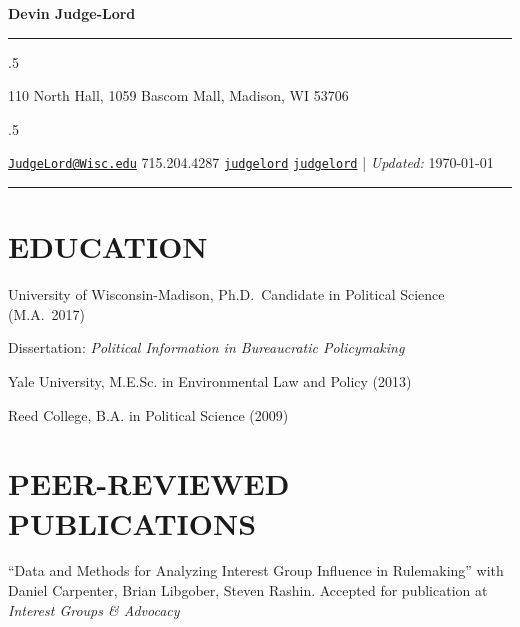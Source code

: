 \documentclass[11pt,]{article}
\providecommand{\tightlist}{%
  \setlength{\itemsep}{0pt}\setlength{\parskip}{0pt}}
\renewenvironment{itemize}{
  \begin{list}{}{
    \setlength{\leftmargin}{1.5em}
  }
}{
  \end{list}
}
\begin{document}
\centerline{\huge \bf Devin Judge-Lord}

\vspace{2 mm}

\hrule

\vspace{2 mm}


\moveleft.5\hoffset\centerline{110 North Hall, 1059 Bascom Mall, Madison, WI 53706}
\moveleft.5\hoffset\centerline{ \faEnvelopeO \hspace{1 mm} \href{mailto:}{\tt \href{mailto:JudgeLord@Wisc.edu}{\nolinkurl{JudgeLord@Wisc.edu}}} \hspace{1 mm}  \faPhone \hspace{1 mm}  715.204.4287  \hspace{1 mm}  \faGithub \hspace{1 mm} \href{http://github.com/judgelord}{\tt judgelord} \hspace{1 mm}   \faTwitter \hspace{1 mm} \href{https:/twitter.com/judgelord}{\tt judgelord} \hspace{1 mm}    | \emph{Updated:} \today}

\vspace{2 mm}

\hrule


\hypertarget{education}{%
\section{EDUCATION}\label{education}}

University of Wisconsin-Madison, Ph.D.~Candidate in Political Science
(M.A.~2017)

\begin{itemize}
\tightlist
\item
  Dissertation: \emph{Political Information in Bureaucratic
  Policymaking}
\end{itemize}

Yale University, M.E.Sc. in Environmental Law and Policy (2013)

Reed College, B.A. in Political Science (2009)

\hypertarget{peer-reviewed-publications}{%
\section{PEER-REVIEWED PUBLICATIONS}\label{peer-reviewed-publications}}

``Data and Methods for Analyzing Interest Group Influence in
Rulemaking'' with Daniel Carpenter, Brian Libgober, Steven Rashin.
Accepted for publication at \emph{Interest Groups \& Advocacy}
\end{document}

